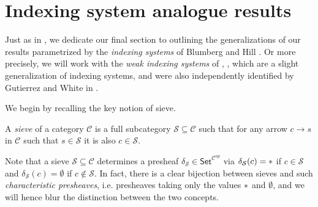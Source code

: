 \documentclass[a4paper,10pt
 ,draft
]{article}%
\begin{document}




\section{Indexing system analogue results}\label{INDEX SEC}


Just as in \cite[\S 9]{Per18}, we dedicate our final section
to outlining the generalizations of our results parametrized by the 
\textit{indexing systems} of Blumberg and Hill \cite{BH15}.
Or more precisely, we will work with the \textit{weak indexing systems}
of \cite[\S 9]{Per18}, \cite[\S 4.4]{BP17},
which are a slight generalization of indexing systems, 
and were also independently identified by Gutierrez and White in \cite{GW18}.

We begin by recalling the key notion of sieve.

\begin{definition}
A \textit{sieve} of a category $\mathcal{C}$
is a full subcategory $\mathcal{S} \subseteq \mathcal{C}$ such that for any arrow $c \to s$ in $\mathcal{C}$ such that $s \in \mathcal{S}$ it is also $c \in \mathcal{S}$.
\end{definition}

Note that a sieve $\mathcal{S} \subseteq \mathcal{C}$
determines a presheaf 
$\delta_{\mathcal{S}} \in \mathsf{Set}^{\mathcal{C}^{op}}$ 
via 
$\delta_{\mathcal{S}}(c) = \**$ if $c \in \mathcal{S}$ and
$\delta_{\mathcal{S}}(c) = \emptyset$ if $c \not \in \mathcal{S}$.
In fact, there is a clear bijection between sieves and such 
\textit{characteristic presheaves}, i.e. presheaves taking only the values $\**$ and $\emptyset$, 
and we will hence blur the distinction between the two concepts.
\end{document}
